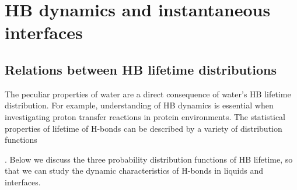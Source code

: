 \chapter{HB dynamics and instantaneous interfaces}
\section{Relations between HB lifetime distributions}\label{relation_hbd}
The peculiar properties of water are a direct consequence of water's HB lifetime distribution\cite{Lee2007,Sciortino1989,Sciortino1990prl}.
For example, understanding of HB dynamics is essential when investigating proton transfer reactions in protein environments\cite{Ishikita2013}.  
The statistical properties of lifetime of H-bonds can be described by a variety of distribution functions{\cite{Rapaport1983, Tanaka1983, Geiger1984,Naberukhin2009}.
Below we discuss the three probability distribution functions of HB lifetime, so that we can study the dynamic characteristics of H-bonds in liquids and interfaces.

}
